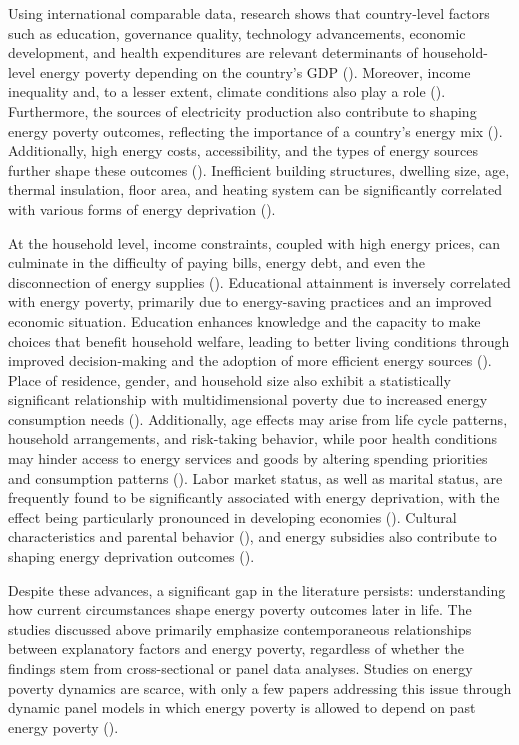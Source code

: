 \documentclass[preprint,authoryear,12pt]{elsarticle}
\newcommand{\citeTwo}[1]{(\cite{#1})}
\begin{document}
Using international comparable data, research shows that country-level factors such as education, governance quality, technology advancements, economic development, and health expenditures are relevant determinants of household-level energy poverty depending on the country’s GDP \citeTwo{BAIA24}. Moreover, income inequality and, to a lesser extent, climate conditions also play a role \citeTwo{IM22}. Furthermore, the sources of electricity production also contribute to shaping energy poverty outcomes, reflecting the importance of a country's energy mix \citeTwo{KUO23}. Additionally, high energy costs, accessibility, and the types of energy sources further shape these outcomes
\citeTwo{PDS21}. Inefficient building structures, dwelling size, age, thermal insulation, floor area, and heating system can be significantly correlated with various forms of energy deprivation \citeTwo{KS20}.

At the household level, income constraints, coupled with high energy prices, can culminate in the difficulty of paying bills, energy debt, and even the disconnection of energy supplies \citeTwo{ABR22,MM24}. Educational attainment is inversely correlated with energy poverty, primarily due to energy-saving practices and an improved economic situation. Education enhances knowledge and the capacity to make choices that benefit household welfare, leading to better living conditions through improved decision-making and the adoption of more efficient energy sources \citeTwo{CAF19}. Place of residence, gender, and household size also exhibit a statistically significant relationship with multidimensional poverty due to increased energy consumption needs \citeTwo{ALXBR20}. Additionally, age effects may arise from life cycle patterns, household arrangements, and risk-taking behavior, while poor health conditions may hinder access to energy services and goods by altering spending priorities and consumption patterns \citeTwo{FFT22}. Labor market status, as well as marital status, are frequently found to be significantly associated with energy deprivation, with the effect being particularly pronounced in developing economies \citeTwo{ALXBR20,ABR22,MM24}. Cultural characteristics and parental behavior \citeTwo{PAS22}, and energy subsidies also contribute to shaping energy deprivation outcomes \citeTwo{HSRKCS23}.

Despite these advances, a significant gap in the literature persists: understanding how current circumstances shape energy poverty outcomes later in life. The studies discussed above primarily emphasize contemporaneous relationships between explanatory factors and energy poverty, regardless of whether the findings stem from cross-sectional or panel data analyses. Studies on energy poverty dynamics are scarce, with only a few papers addressing this issue through dynamic panel models in which energy poverty is allowed to depend on past energy poverty \citeTwo{AD20,DJ21,HK23}. 
\end{document}
